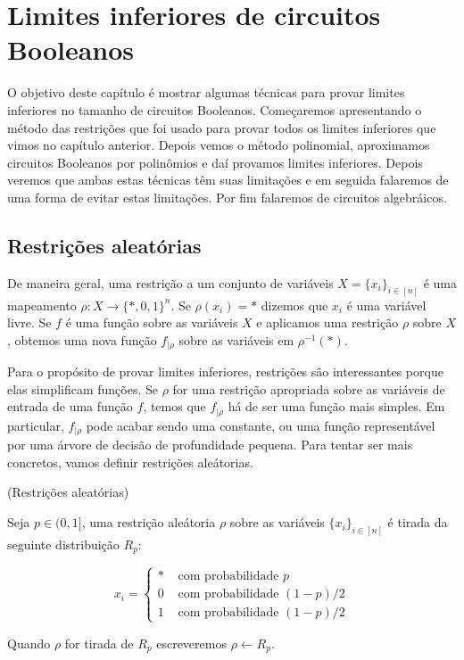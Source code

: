 \chapter{Limites inferiores de circuitos Booleanos}

O objetivo deste capítulo é mostrar algumas técnicas para provar limites inferiores no tamanho de circuitos Booleanos. Começaremos apresentando o método das restrições que foi usado para provar todos os limites inferiores que vimos no capítulo anterior. Depois vemos o método polinomial, aproximamos circuitos Booleanos por polinômios e daí provamos limites inferiores. Depois veremos que ambas estas técnicas têm suas limitações e em seguida falaremos de uma forma de evitar estas limitações. Por fim falaremos de circuitos algebráicos.

\section{Restrições aleatórias}

De maneira geral, uma restrição a um conjunto de variáveis $X = \{x_{i}\}_{i \in [n]}$ é uma mapeamento $\rho: X \to \{*, 0, 1\}^{n}$. Se $\rho(x_{i}) = *$ dizemos que $x_{i}$ é uma variável livre. Se $f$ é uma função sobre as variáveis $X$ e aplicamos uma restrição $\rho$ sobre $X$, obtemos uma nova função $f_{\lvert \rho}$ sobre as variáveis em $\rho^{-1}(*)$.

Para o propósito de provar limites inferiores, restrições são interessantes porque elas simplificam funções. Se $\rho$ for uma restrição apropriada sobre as variáveis de entrada de uma função $f$, temos que $f_{\lvert \rho}$ há de ser uma função mais simples. Em particular, $f_{\lvert \rho}$ pode acabar sendo uma constante, ou uma função representável por uma árvore de decisão de profundidade pequena. Para tentar ser mais concretos, vamos definir restrições aleátorias.

\begin{defi} (Restrições aleatórias) \label{random_restrictions}

Seja $p \in (0, 1]$, uma restrição aleátoria $\rho$ sobre as variáveis $\{x_{i}\}_{i \in [n]}$ é tirada da seguinte distribuição $R_{p}$:

\begin{equation*}
	x_{i} = \begin{cases}
			* & \text{ com probabilidade } p \\
			0 & \text{ com probabilidade } (1 - p)/2 \\
			1 & \text{ com probabilidade } (1 - p)/2
		\end{cases}
\end{equation*}

Quando $\rho$ for tirada de $R_{p}$ escreveremos $\rho \leftarrow R_{p}$.

\end{defi}

